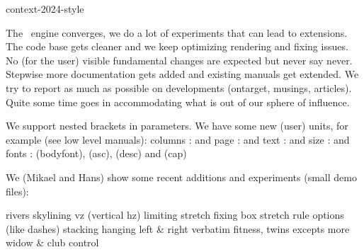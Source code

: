 
\environment context-2024-style

\startdocument
  [title={improvements},
   banner={recent and upcoming}, %
   location={context\enspace {\bf 2024}\enspace meeting}]

\starttitle[title=Development]

\startitemize
\startitem The \LUAMETATEX\ engine converges, we do a lot of experiments that can lead to extensions. \stopitem
\startitem The code base gets cleaner and we keep optimizing rendering and fixing issues. \stopitem
\startitem No (for the user) visible fundamental changes are expected but never say never. \stopitem
\startitem Stepwise more documentation gets added and existing manuals get extended. \stopitem
\startitem We try to report as much as possible on developments (ontarget, musings, articles). \stopitem
\startitem Quite some time goes in accommodating what is out of our sphere of influence. \stopitem
\stopitemize

\stoptitle

\starttitle[title=Interfacing]

\startitemize
\startitem We support nested brackets in parameters. \stopitem
\startitem We have some new (user) units, for example (see low level manuals):
    \startitemize[packed]
        \startitem columns :  and  \stopitem
        \startitem page    :  and  \stopitem
        \startitem text    :  and  \stopitem
        \startitem size    :  and  \stopitem
        \startitem fonts   :  (bodyfont),  (asc),  (desc) and  (cap) \stopitem
    \stopitemize
\stopitem
\stopitemize

\stoptitle

\starttitle[title=Typesetting]

We (Mikael and Hans) show some recent additions and experiments (small demo files):

\startitem rivers \stopitem
\startitem skylining \stopitem
\startitem vz (vertical hz) \stopitem
\startitem limiting stretch \stopitem
\startitem fixing box stretch \stopitem
\startitem rule options (like dashes) \stopitem
\startitem stacking \stopitem
\startitem hanging left & right verbatim \stopitem
\startitem fitness, twins \stopitem
\startitem excepts \stopitem
\startitem more widow & club control \stopitem
\stopitemize

\vfill

